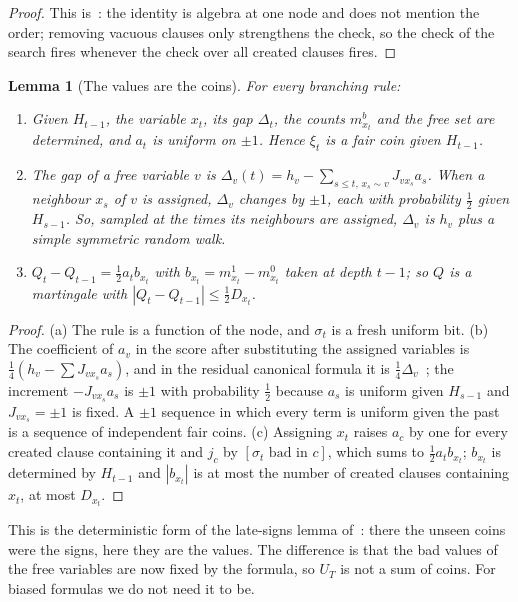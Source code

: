 \documentclass[11pt,a4paper]{article}
\newtheorem{lemma}[theorem]{Lemma}
\theoremstyle{definition}
\theoremstyle{remark}
\begin{document}
\begin{proof}
This is~\cite[Lemma~2, Remark~3]{N7}: the identity is algebra at one node and
does not mention the order; removing vacuous clauses only strengthens the
check, so the check of the search fires whenever the check over all created
clauses fires.
\end{proof}

\begin{lemma}[The values are the coins]\label{lem:coins}
For every branching rule:
\begin{enumerate}
 \item[(a)] Given $H_{t-1}$, the variable $x_t$, its gap $\Delta_t$, the
 counts $m^b_{x_t}$ and the free set are determined, and $a_t$ is uniform on
 $\pm1$. Hence $\xi_t$ is a fair coin given $H_{t-1}$.
 \item[(b)] The gap of a free variable $v$ is
 $\Delta_v(t)=h_v-\sum_{s\le t,\,x_s\sim v}J_{vx_s}a_s$. When a neighbour
 $x_s$ of $v$ is assigned, $\Delta_v$ changes by $\pm1$, each with probability
 $\frac12$ given $H_{s-1}$. So, sampled at the times its neighbours are
 assigned, $\Delta_v$ is $h_v$ plus a simple symmetric random walk.
 \item[(c)] $Q_t-Q_{t-1}=\frac12a_tb_{x_t}$ with $b_{x_t}=m^1_{x_t}-m^0_{x_t}$
 taken at depth $t-1$; so $Q$ is a martingale with
 $|Q_t-Q_{t-1}|\le\frac12D_{x_t}$.
\end{enumerate}
\end{lemma}

\begin{proof}
(a) The rule is a function of the node, and $\sigma_t$ is a fresh uniform bit.
(b) The coefficient of $a_v$ in the score after substituting the assigned
variables is $\frac14(h_v-\sum J_{vx_s}a_s)$, and in the residual canonical
formula it is $\frac14\Delta_v$~\cite[Lemma~4(a)]{N9}; the increment
$-J_{vx_s}a_s$ is $\pm1$ with probability $\frac12$ because $a_s$ is uniform
given $H_{s-1}$ and $J_{vx_s}=\pm1$ is fixed. A $\pm1$ sequence in which every
term is uniform given the past is a sequence of independent fair coins.
(c) Assigning $x_t$ raises $a_c$ by one for every created clause containing
it and $j_c$ by $[\sigma_t\text{ bad in }c]$, which sums to $\frac12a_tb_{x_t}$;
$b_{x_t}$ is determined by $H_{t-1}$ and $|b_{x_t}|$ is at most the number of
created clauses containing $x_t$, at most $D_{x_t}$.
\end{proof}

This is the deterministic form of the late-signs lemma of~\cite{N8}: there the
unseen coins were the signs, here they are the values. The difference is that
the bad values of the free variables are now fixed by the formula, so $U_T$ is
not a sum of coins. For biased formulas we do not need it to be.
\end{document}
